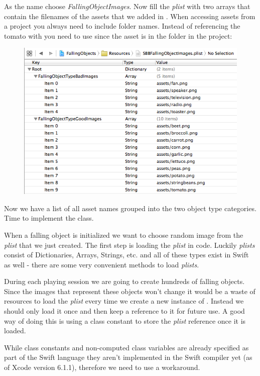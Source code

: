 As the name choose \textit{FallingObjectImages}. Now fill the \textit{plist}
with two arrays that contain the filenames of the assets that we added in \SB{}.
When accessing assets from a \SB{} project you always need to include folder
names. Instead of referencing the tomato with  you need
to use  since the asset is in the
 folder in the \SB{} project:

\begin{figure}[H]
		\centering
		\includegraphics[width=0.7\linewidth]{images/Chapter2/plist_setup.png}
\end{figure}
Now we have a list of all asset names grouped into the two object type
categories. Time to implement the  class.

When a falling object is initialized we want to
choose random image from the \textit{plist} that we just created.
The first step is loading the \textit{plist} in code. Luckily \textit{plists}
consist of Dictionaries, Arrays, Strings, etc. and all of these types exist in
Swift as well - there are some very convenient methods to load
\textit{plists}. 

During each playing session we are going to create hundreds of
falling objects. Since the images that represent these objects won't change it
would be a waste of resources to load the \textit{plist} every time we create a
new instance of . Instead we should only load it
once and then keep a reference to it for future use. A good way of doing this is
using a class constant to store the \textit{plist} reference once it is loaded.

\begin{details}[frametitle={Class variables in Swift}] 
While class constants and non-computed class variables are already specified as
part of the Swift language they aren't implemented in the Swift compiler yet 
(as of Xcode version 6.1.1), therefore we need to use a workaround. 
\end{details}

